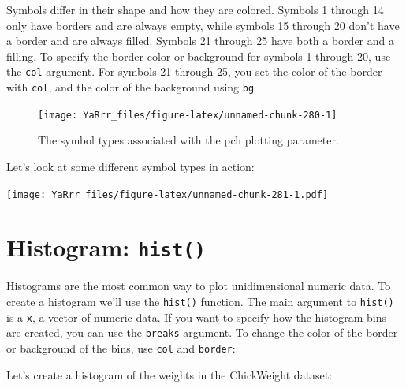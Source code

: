 \documentclass[]{book}
\newenvironment{Shaded}{\begin{snugshade}}{\end{snugshade}}
\newcommand{\KeywordTok}[1]{\textcolor[rgb]{0.13,0.29,0.53}{\textbf{{#1}}}}
\newcommand{\DataTypeTok}[1]{\textcolor[rgb]{0.13,0.29,0.53}{{#1}}}
\newcommand{\DecValTok}[1]{\textcolor[rgb]{0.00,0.00,0.81}{{#1}}}
\newcommand{\StringTok}[1]{\textcolor[rgb]{0.31,0.60,0.02}{{#1}}}
\newcommand{\NormalTok}[1]{{#1}}
\theoremstyle{definition}
\theoremstyle{definition}
\theoremstyle{remark}
\begin{document}
Symbols differ in their shape and how they are colored. Symbols 1
through 14 only have borders and are always empty, while symbols 15
through 20 don't have a border and are always filled. Symbols 21 through
25 have both a border and a filling. To specify the border color or
background for symbols 1 through 20, use the \texttt{col} argument. For
symbols 21 through 25, you set the color of the border with
\texttt{col}, and the color of the background using \texttt{bg}

\begin{figure}

{\centering \texttt{[image: YaRrr\_files/figure-latex/unnamed-chunk-280-1]} 

}

\caption{The symbol types associated with the pch plotting parameter.}\label{fig:unnamed-chunk-280}
\end{figure}

Let's look at some different symbol types in action:

\texttt{[image: YaRrr\_files/figure-latex/unnamed-chunk-281-1.pdf]}

\section{\texorpdfstring{Histogram:
\texttt{hist()}}{Histogram: hist()}}\label{histogram-hist}

Histograms are the most common way to plot unidimensional numeric data.
To create a histogram we'll use the \texttt{hist()} function. The main
argument to \texttt{hist()} is a \texttt{x}, a vector of numeric data.
If you want to specify how the histogram bins are created, you can use
the \texttt{breaks} argument. To change the color of the border or
background of the bins, use \texttt{col} and \texttt{border}:

Let's create a histogram of the weights in the ChickWeight dataset:

\begin{Shaded}
\end{Shaded}
\end{document}
